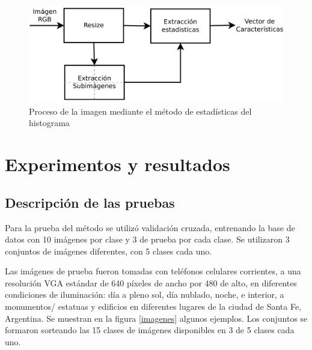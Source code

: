 \documentclass[conference,spanish,a4paper,10pt,oneside,final]{tfmpd}
\begin{document}
\begin{figure}
\begin{center}
\includegraphics[scale=0.25]{../diagramas/procesoestadisticas} 
\end{center}
\caption{Proceso de la imagen mediante el método de estadísticas del histograma}
\label{procesoestadisticas}
\end{figure}

%
%
\subsection*{}

%
%
%
%
\section{Experimentos y resultados}
%
%
\subsection{Descripción de las pruebas}
Para la prueba del método se utilizó validación cruzada, entrenando la base de
datos con 10 imágenes por clase y 3 de prueba por cada clase. Se utilizaron
3 conjuntos de imágenes diferentes, con 5 clases cada uno.

Las imágenes de prueba fueron tomadas con teléfonos celulares corrientes, a una
resolución VGA estándar de 640 píxeles de ancho por 480 de alto, en
diferentes condiciones
de iluminación: día a pleno sol, día nublado, noche, e interior, a monumentos/%
estatuas y edificios en diferentes lugares de la ciudad de Santa Fe, Argentina.
Se muestran en la figura \ref{imagenes} algunos ejemplos.
Los conjuntos se formaron sorteando las 15 clases de imágenes disponibles en
3 de 5 clases cada uno.
\end{document}
